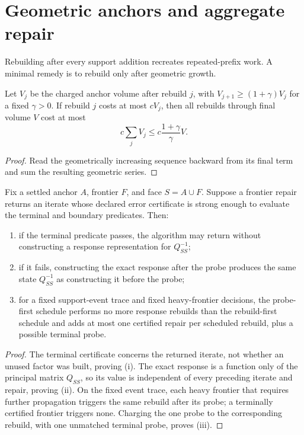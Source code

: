 \section{Geometric anchors and aggregate repair}
\label{sec:epochs}

Rebuilding after every support addition recreates repeated-prefix work.  A
minimal remedy is to rebuild only after geometric growth.

\begin{lemma}
\label{lem:geometric-rebuild}
Let $V_j$ be the charged anchor volume after rebuild $j$, with
$V_{j+1}\geq(1+\gamma)V_j$ for a fixed $\gamma>0$.  If rebuild $j$ costs at
most $cV_j$, then all rebuilds through final volume $V$ cost at most
\begin{equation}
 c\sum_jV_j\leq c\frac{1+\gamma}{\gamma}V.
 \label{eq:rebuild-sum}
\end{equation}
\end{lemma}

\begin{proof}
Read the geometrically increasing sequence backward from its final term and
sum the resulting geometric series.
\end{proof}

\begin{lemma}
\label{lem:probe-before-rebuild}
Fix a settled anchor $A$, frontier $F$, and face $S=A\cup F$.  Suppose a
frontier repair returns an iterate whose declared error certificate is strong
enough to evaluate the terminal and boundary predicates.  Then:
\begin{enumerate}[label=(\roman*)]
\item if the terminal predicate passes, the algorithm may return without
      constructing a response representation for $Q_{SS}^{-1}$;
\item if it fails, constructing the exact response after the probe produces
      the same state $Q_{SS}^{-1}$ as constructing it before the probe;
\item for a fixed support-event trace and fixed heavy-frontier decisions, the
      probe-first schedule performs no more response rebuilds than the
      rebuild-first schedule and adds at most one certified repair per
      scheduled rebuild, plus a possible terminal probe.
\end{enumerate}
\end{lemma}

\begin{proof}
The terminal certificate concerns the returned iterate, not whether an unused
factor was built, proving (i).  The exact response is a function only of the
principal matrix $Q_{SS}$, so its value is independent of every preceding
iterate and repair, proving (ii).  On the fixed event trace, each heavy
frontier that requires further propagation triggers the same rebuild after its
probe; a terminally certified frontier triggers none.  Charging the one probe
to the corresponding rebuild, with one unmatched terminal probe, proves (iii).
\end{proof}

